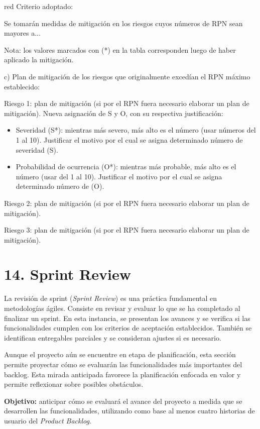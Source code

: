\documentclass[
11pt, %
]{charter}
\begin{document}
\begin{consigna}{red}
Criterio adoptado: 

Se tomarán medidas de mitigación en los riesgos cuyos números de RPN sean mayores a...

Nota: los valores marcados con (*) en la tabla corresponden luego de haber aplicado la mitigación.

c) Plan de mitigación de los riesgos que originalmente excedían el RPN máximo establecido:
 
Riesgo 1: plan de mitigación (si por el RPN fuera necesario elaborar un plan de mitigación).
  Nueva asignación de S y O, con su respectiva justificación:
  \begin{itemize}
	\item Severidad (S*): mientras más severo, más alto es el número (usar números del 1 al 10).
          Justificar el motivo por el cual se asigna determinado número de severidad (S).
	\item Probabilidad de ocurrencia (O*): mientras más probable, más alto es el número (usar del 1 al 10).
          Justificar el motivo por el cual se asigna determinado número de (O).
	\end{itemize}

Riesgo 2: plan de mitigación (si por el RPN fuera necesario elaborar un plan de mitigación).
 
Riesgo 3: plan de mitigación (si por el RPN fuera necesario elaborar un plan de mitigación).

\end{consigna}

\section{14. Sprint Review}
\label{sec:sprint_review}

La revisión de sprint (\emph{Sprint Review}) es una práctica fundamental en metodologías ágiles. Consiste en revisar y evaluar lo que se ha completado al finalizar un sprint. En esta instancia, se presentan los avances y se verifica si las funcionalidades cumplen con los criterios de aceptación establecidos. También se identifican entregables parciales y se consideran ajustes si es necesario.

Aunque el proyecto aún se encuentre en etapa de planificación, esta sección permite proyectar cómo se evaluarán las funcionalidades más importantes del backlog. Esta mirada anticipada favorece la planificación enfocada en valor y permite reflexionar sobre posibles obstáculos.

\textbf{Objetivo:} anticipar cómo se evaluará el avance del proyecto a medida que se desarrollen las funcionalidades, utilizando como base al menos cuatro historias de usuario del \emph{Product Backlog}.
\end{document}
